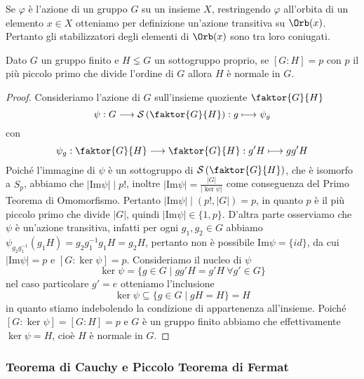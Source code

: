 \documentclass[11pt]{scrartcl}
\begin{document}
\begin{remark}
    Se $\varphi$ è l'azione di un gruppo $G$ su un insieme $X$, restringendo
    $\varphi$ all'orbita di un elemento $x \in X$ otteniamo per definizione
    un'azione transitiva su $\Orb(x)$. Pertanto gli stabilizzatori degli elementi 
    di $\Orb(x)$ sono tra loro coniugati.
\end{remark}

\begin{proposition}
    Dato $G$ un gruppo finito e $H \lneq G$ un sottogruppo proprio, se $[G:H] = p$
    con $p$ il più piccolo primo che divide l'ordine di $G$ allora $H$ è normale
    in $G$.
\end{proposition}

\begin{proof}
    Consideriamo l'azione di $G$ sull'insieme quoziente $\faktor{G}{H}$ 
    \[
        \psi: G\longrightarrow\mathcal{S}\left(\faktor{G}{H}\right) : g \longmapsto \psi_g
    \]con 
    \[
        \psi_g : \faktor{G}{H}\longrightarrow\faktor{G}{H} : g'H\longmapsto gg'H
    \]Poiché l'immagine di $\psi$ è un sottogruppo di $\mathcal{S}\left(\faktor{G}{H}\right)$,
    che è isomorfo a $S_p$, abbiamo che $|\mathrm{Im}\psi| \mid p!$, inoltre 
    $|\mathrm{Im}\psi| = \displaystyle\frac{|G|}{|\ker \psi|}$ come conseguenza
    del Primo Teorema di Omomorfismo. Pertanto $|\mathrm{Im}\psi| \mid (p!, |G|) = p$,
    in quanto $p$ è il più piccolo primo che divide $|G|$, quindi $|\mathrm{Im}\psi| \in \{1, p\}$.
    D'altra parte osserviamo che $\psi$ è un'azione transitiva, infatti per 
    ogni $g_1, g_2 \in G$ abbiamo $\psi_{g_2^{}g_1^{-1}}(g_1H) = g_2g_1^{-1}g_1H = g_2H$,
    pertanto non è possibile $\mathrm{Im}\psi = \{id\}$, da cui $|\mathrm{Im}\psi| = p$
    e $[G:\ker\psi] = p$. Consideriamo il nucleo di $\psi$
    \[
        \ker\psi = \{g\in G\mid gg'H = g'H~\forall g' \in G\}
    \]
    nel caso particolare $g' = e$ otteniamo l'inclusione
    \[
        \ker\psi \subseteq \{g \in G\mid gH = H\} = H
    \]
    in quanto stiamo indebolendo la condizione di appartenenza all'insieme.
    Poiché $[G:\ker \psi] = [G : H] = p$ e $G$ è un gruppo finito abbiamo
    che effettivamente $\ker\psi = H$, cioè $H$ è normale in $G$.
\end{proof}


\subsubsection{Teorema di Cauchy e Piccolo Teorema di Fermat}
\end{document}
